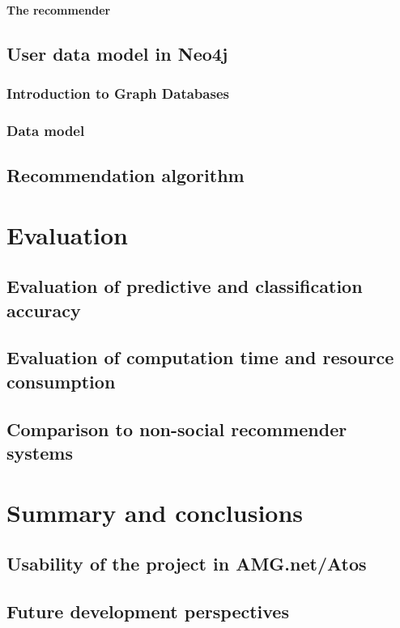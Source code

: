 \documentclass[12pt]{report}
\begin{document}
\subsubsection{The recommender}

%
\section{User data model in Neo4j}

\subsection{Introduction to Graph Databases}

\subsection{Data model}

\section{Recommendation algorithm}

\chapter{Evaluation}
\section{Evaluation of predictive and classification accuracy}
\section{Evaluation of computation time and resource consumption}
\section{Comparison to non-social recommender systems}

\chapter{Summary and conclusions}
\section{Usability of the project in AMG.net/Atos}
\section{Future development perspectives}
\end{document}

